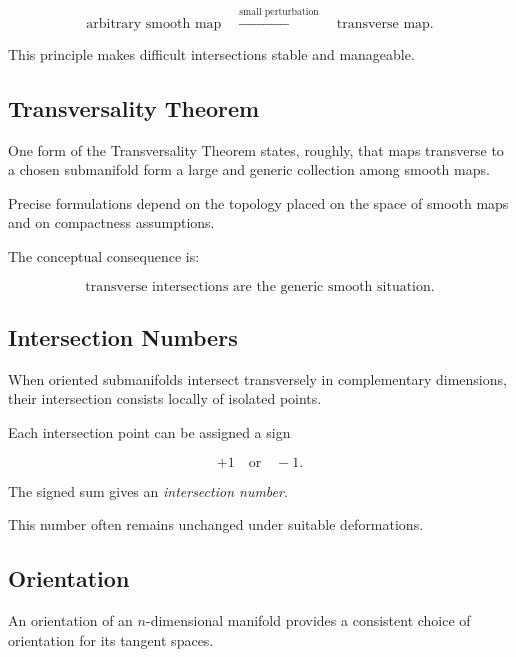 \[
\boxed{
\text{arbitrary smooth map}
\quad
\overset{\text{small perturbation}}{\longrightarrow}
\quad
\text{transverse map}.
}
\]

This principle makes difficult intersections stable and manageable.

\subsection{Transversality Theorem}
\label{subsec:transversality-theorem}

One form of the Transversality Theorem states, roughly, that maps transverse
to a chosen submanifold form a large and generic collection among smooth
maps.

Precise formulations depend on the topology placed on the space of smooth
maps and on compactness assumptions.

The conceptual consequence is:

\[
\boxed{
\text{transverse intersections are the generic smooth situation}.
}
\]

\subsection{Intersection Numbers}
\label{subsec:intersection-numbers}

When oriented submanifolds intersect transversely in complementary
dimensions, their intersection consists locally of isolated points.

Each intersection point can be assigned a sign

\[
\boxed{
+1
\quad\text{or}\quad
-1.
}
\]

The signed sum gives an \emph{intersection number}.

This number often remains unchanged under suitable deformations.

\subsection{Orientation}
\label{subsec:differential-topology-orientation}

An orientation of an \(n\)-dimensional manifold provides a consistent choice
of orientation for its tangent spaces.

